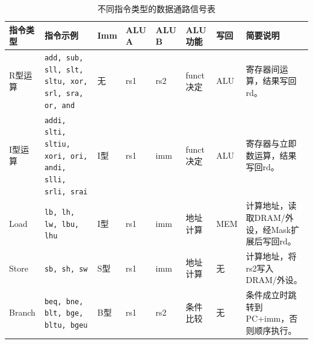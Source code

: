 \documentclass[12pt,a4paper]{ctexart}
\begin{document}
\begin{table}[H]
	\centering
	\caption{不同指令类型的数据通路信号表}
	\label{tab:datapath_signals}
	\scriptsize
	\setlength{\tabcolsep}{3pt}
	\renewcommand{\arraystretch}{1.15}
	\begin{tabularx}{\textwidth}{
		>{\centering\arraybackslash}p{1.35cm}
		>{\raggedright\arraybackslash}p{2.4cm}
		>{\centering\arraybackslash}p{0.9cm}
		>{\centering\arraybackslash}p{1.1cm}
		>{\centering\arraybackslash}p{1.1cm}
		>{\centering\arraybackslash}p{1.35cm}
		>{\centering\arraybackslash}p{1.2cm}
		X}
		\toprule
		指令类型                                                          & 指令示例 & Imm & ALU A   & ALU B & ALU功能 & 写回 & 简要说明 \\
		\midrule

		R型运算                                                          &
		\texttt{add, sub, sll, slt, sltu, xor, srl, sra, or, and}     &
		无                                                             & rs1  & rs2 & funct决定 & ALU   &
		寄存器间运算，结果写回rd。                                                                                                   \\

		I型运算                                                          &
		\texttt{addi, slti, sltiu, xori, ori, andi, slli, srli, srai} &
		I型                                                            & rs1  & imm & funct决定 & ALU   &
		寄存器与立即数运算，结果写回rd。                                                                                                \\

		Load                                                          &
		\texttt{lb, lh, lw, lbu, lhu}                                 &
		I型                                                            & rs1  & imm & 地址计算    & MEM   &
		计算地址，读取DRAM/外设，经Mask扩展后写回rd。                                                                                     \\

		Store                                                         &
		\texttt{sb, sh, sw}                                           &
		S型                                                            & rs1  & imm & 地址计算    & 无     &
		计算地址，将rs2写入DRAM/外设。                                                                                              \\

		Branch                                                        &
		\texttt{beq, bne, blt, bge, bltu, bgeu}                       &
		B型                                                            & rs1  & rs2 & 条件比较    & 无     &
		条件成立时跳转到PC+imm，否则顺序执行。                                                                                           \\


\end{tabularx}
\end{table}
\end{document}

